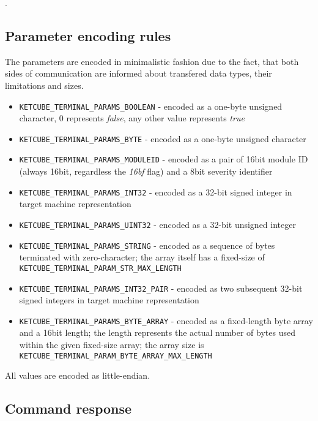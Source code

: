 .

\subsection{Parameter encoding rules}

The parameters are encoded in minimalistic fashion due to the fact, that both sides of communication are informed about transfered data types, their limitations and sizes.

\begin{itemize}
	\item \texttt{KETCUBE\_TERMINAL\_PARAMS\_BOOLEAN} - encoded as a one-byte unsigned character, 0 represents \textit{false}, any other value represents \textit{true}
	\item \texttt{KETCUBE\_TERMINAL\_PARAMS\_BYTE} - encoded as a one-byte unsigned character
	\item \texttt{KETCUBE\_TERMINAL\_PARAMS\_MODULEID} - encoded as a pair of 16bit module ID (always 16bit, regardless the \textit{16bf} flag) and a 8bit severity identifier
	\item \texttt{KETCUBE\_TERMINAL\_PARAMS\_INT32} - encoded as a 32-bit signed integer in target machine representation
	\item \texttt{KETCUBE\_TERMINAL\_PARAMS\_UINT32} - encoded as a 32-bit unsigned integer
	\item \texttt{KETCUBE\_TERMINAL\_PARAMS\_STRING} - encoded as a sequence of bytes terminated with zero-character; the array itself has a fixed-size of \texttt{KETCUBE\_TERMINAL\_PARAM\_STR\_MAX\_LENGTH}
	\item \texttt{KETCUBE\_TERMINAL\_PARAMS\_INT32\_PAIR} - encoded as two subsequent 32-bit signed integers in target machine representation
	\item \texttt{KETCUBE\_TERMINAL\_PARAMS\_BYTE\_ARRAY} - encoded as a fixed-length byte array and a 16bit length; the length represents the actual number of bytes used within the given fixed-size array; the array size is \texttt{KETCUBE\_TERMINAL\_PARAM\_BYTE\_ARRAY\_MAX\_LENGTH}
\end{itemize}

All values are encoded as little-endian.

\subsection{Command response}

